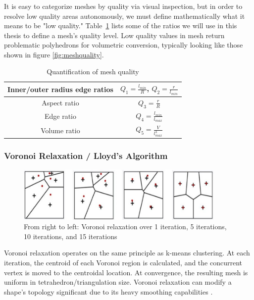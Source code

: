 \documentclass[12pt]{drexelthesis}
\let\Oldsubsubsection\subsubsection
\renewcommand{\subsubsection}{\FloatBarrier\Oldsubsubsection}
\begin{document}
It is easy to categorize meshes by quality via visual inspection, but in order to resolve low quality areas autonomously, we must define mathematically what it means to be "low quality." Table~\ref{table:meshquality} lists some of the ratios we will use in this thesis to define a mesh's quality level. Low  quality  values  in  mesh  return  problematic  polyhedrons  for  volumetric  conversion,  typically  looking  like  those  shown  in  figure \ref{fig:meshquality}.

\begin{table}[!ht]
	\centering
		\caption{Quantification of mesh quality}
		\begin{tabular}{| c | c |}
			\hline
			Inner/outer radius edge ratios & $Q_{1} = \frac{l_{min}}{R}$, $Q_{2} = \frac{r}{l_{min}}$
			\\ \hline
			Aspect ratio & $Q_{3} = \frac{r}{R}$
			\\ \hline
			Edge ratio & $Q_{4} = \frac{l_{min}}{l_{max}}$
			\\ \hline
			Volume ratio & $Q_{5} = \frac{V}{l_{max}^{3}}$
			\\ \hline
		\end{tabular}
		\label{table:meshquality}
\end{table}





\subsubsection{Voronoi Relaxation / Lloyd's Algorithm}
\label{optimization:voronoirelaxation}
\begin{figure}[!ht]
	\centering
		\includegraphics[width=4in]{voronoirelaxation.PNG}
		\caption[Demonstration of voronoi relaxation over several iterations]
		{\centering From right to left: Voronoi relaxation over 1 iteration, 5 iterations, 10 iterations, and 15 iterations}
		\label{fig:voronoirelaxation}
\end{figure}

Voronoi  relaxation  operates  on  the  same  principle  as  k-means  clustering.  At  each  iteration,  the  centroid  of  each  Voronoi  region  is  calculated,  and  the  concurrent  vertex  is  moved  to  the  centroidal  location.  At  convergence,  the  resulting  mesh  is  uniform  in  tetrahedron/triangulation  size.  Voronoi  relaxation  can  modify  a  shape’s  topology  significant  due  to  its  heavy  smoothing  capabilities  \cite{RN61}.
\end{document}
